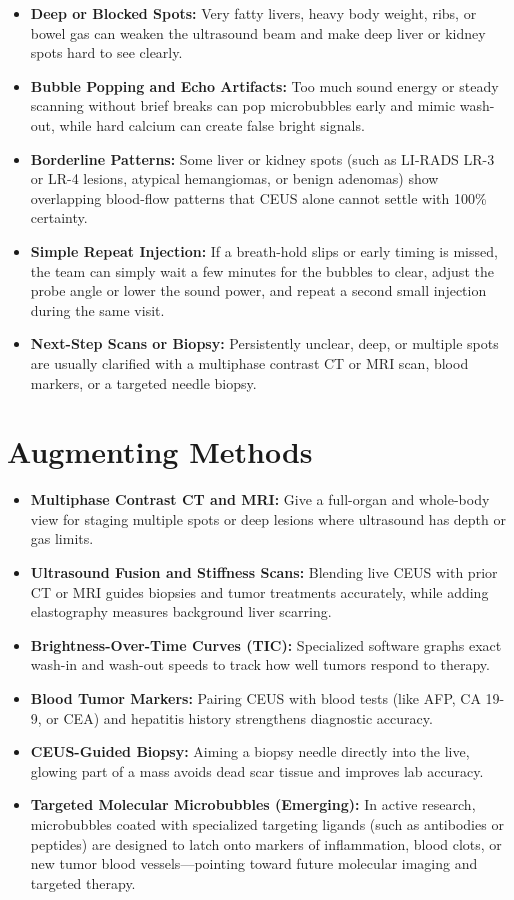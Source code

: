 \begin{itemize}
    \item \textbf{Deep or Blocked Spots:} Very fatty livers, heavy body weight, ribs, or bowel gas can weaken the ultrasound beam and make deep liver or kidney spots hard to see clearly.
    \item \textbf{Bubble Popping and Echo Artifacts:} Too much sound energy or steady scanning without brief breaks can pop microbubbles early and mimic wash-out, while hard calcium can create false bright signals.
    \item \textbf{Borderline Patterns:} Some liver or kidney spots (such as LI-RADS LR-3 or LR-4 lesions, atypical hemangiomas, or benign adenomas) show overlapping blood-flow patterns that CEUS alone cannot settle with 100\% certainty.
    \item \textbf{Simple Repeat Injection:} If a breath-hold slips or early timing is missed, the team can simply wait a few minutes for the bubbles to clear, adjust the probe angle or lower the sound power, and repeat a second small injection during the same visit.
    \item \textbf{Next-Step Scans or Biopsy:} Persistently unclear, deep, or multiple spots are usually clarified with a multiphase contrast CT or MRI scan, blood markers, or a targeted needle biopsy.
\end{itemize}

\section{Augmenting Methods}

\begin{itemize}
    \item \textbf{Multiphase Contrast CT and MRI:} Give a full-organ and whole-body view for staging multiple spots or deep lesions where ultrasound has depth or gas limits.
    \item \textbf{Ultrasound Fusion and Stiffness Scans:} Blending live CEUS with prior CT or MRI guides biopsies and tumor treatments accurately, while adding elastography measures background liver scarring.
    \item \textbf{Brightness-Over-Time Curves (TIC):} Specialized software graphs exact wash-in and wash-out speeds to track how well tumors respond to therapy.
    \item \textbf{Blood Tumor Markers:} Pairing CEUS with blood tests (like AFP, CA 19-9, or CEA) and hepatitis history strengthens diagnostic accuracy.
    \item \textbf{CEUS-Guided Biopsy:} Aiming a biopsy needle directly into the live, glowing part of a mass avoids dead scar tissue and improves lab accuracy.
    \item \textbf{Targeted Molecular Microbubbles (Emerging):} In active research, microbubbles coated with specialized targeting ligands (such as antibodies or peptides) are designed to latch onto markers of inflammation, blood clots, or new tumor blood vessels---pointing toward future molecular imaging and targeted therapy.
\end{itemize}

